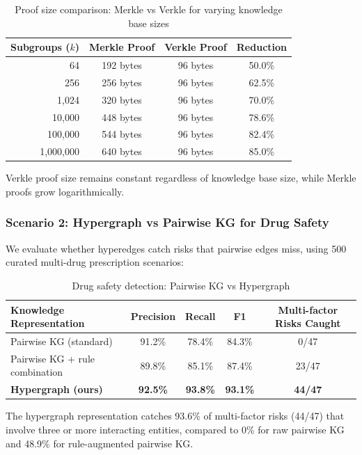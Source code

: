 \documentclass[11pt,a4paper]{article}
\begin{document}
\begin{table}[H]
\centering
\caption{Proof size comparison: Merkle vs Verkle for varying knowledge base sizes}
\label{tab:proof_size}
\begin{tabular}{@{}rccc@{}}
\toprule
\textbf{Subgroups ($k$)} & \textbf{Merkle Proof} & \textbf{Verkle Proof} & \textbf{Reduction} \\ \midrule
64 & 192 bytes & 96 bytes & 50.0\% \\
256 & 256 bytes & 96 bytes & 62.5\% \\
1,024 & 320 bytes & 96 bytes & 70.0\% \\
10,000 & 448 bytes & 96 bytes & 78.6\% \\
100,000 & 544 bytes & 96 bytes & 82.4\% \\
1,000,000 & 640 bytes & 96 bytes & 85.0\% \\ \bottomrule
\end{tabular}
\end{table}

Verkle proof size remains constant regardless of knowledge base size, while Merkle proofs grow logarithmically.

\subsubsection{Scenario 2: Hypergraph vs Pairwise KG for Drug Safety}

We evaluate whether hyperedges catch risks that pairwise edges miss, using 500 curated multi-drug prescription scenarios:

\begin{table}[H]
\centering
\caption{Drug safety detection: Pairwise KG vs Hypergraph}
\label{tab:hypergraph_eval}
\begin{tabular}{@{}lcccc@{}}
\toprule
\textbf{Knowledge Representation} & \textbf{Precision} & \textbf{Recall} & \textbf{F1} & \textbf{Multi-factor Risks Caught} \\ \midrule
Pairwise KG (standard) & 91.2\% & 78.4\% & 84.3\% & 0/47 \\
Pairwise KG + rule combination & 89.8\% & 85.1\% & 87.4\% & 23/47 \\
\textbf{Hypergraph (ours)} & \textbf{92.5\%} & \textbf{93.8\%} & \textbf{93.1\%} & \textbf{44/47} \\ \bottomrule
\end{tabular}
\end{table}

The hypergraph representation catches 93.6\% of multi-factor risks (44/47) that involve three or more interacting entities, compared to 0\% for raw pairwise KG and 48.9\% for rule-augmented pairwise KG.
\end{document}

